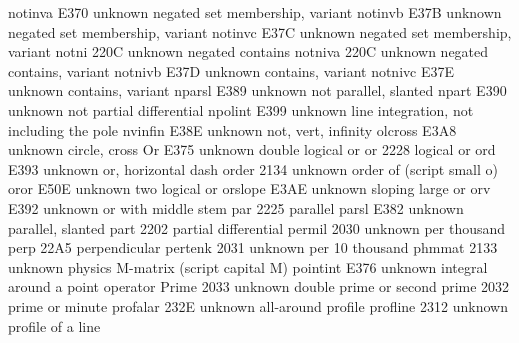 notinva                          E370 {unknown} negated set membership, variant
 notinvb                          E37B {unknown} negated set membership, variant
 notinvc                          E37C {unknown} negated set membership, variant
 notni                            220C {unknown} negated contains
 notniva                          220C {unknown} negated contains, variant
 notnivb                          E37D {unknown} contains, variant
 notnivc                          E37E {unknown} contains, variant
 nparsl                           E389 {unknown} not parallel, slanted
 npart                            E390 {unknown} not partial differential
 npolint                          E399 {unknown} line integration, not including the pole
 nvinfin                          E38E {unknown} not, vert, infinity
 olcross                          E3A8 {unknown} circle, cross
 Or                               E375 {unknown} double logical or
 or                               2228 {\vee} logical or
 ord                              E393 {unknown} or, horizontal dash
 order                            2134 {unknown} order of (script small o)
 oror                             E50E {unknown} two logical or
 orslope                          E3AE {unknown} sloping large or
 orv                              E392 {unknown} or with middle stem
 par                              2225 {\parallel} parallel
 parsl                            E382 {unknown} parallel, slanted
 part                             2202 {\partial} partial differential
 permil                           2030 {unknown} per thousand
 perp                             22A5 {\perp} perpendicular
 pertenk                          2031 {unknown} per 10 thousand
 phmmat                           2133 {unknown} physics M-matrix (script capital M)
 pointint                         E376 {unknown} integral around a point operator
 Prime                            2033 {unknown} double prime or second
 prime                            2032 {\prime} prime or minute
 profalar                         232E {unknown} all-around profile
 profline                         2312 {unknown} profile of a line
